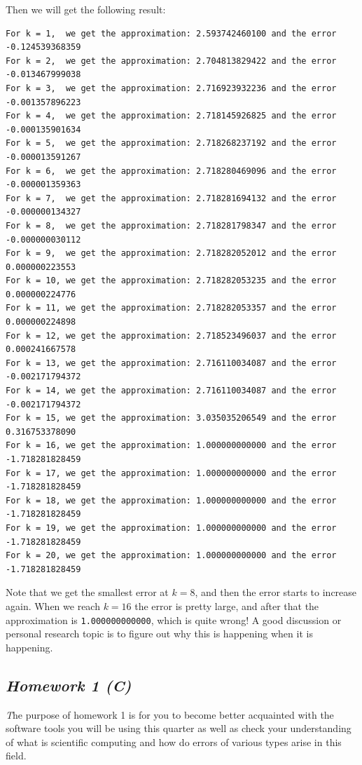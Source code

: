 \documentclass[11pt,a4paper,oneside]{report}
\begin{document}
Then we will get the following result:
\begin{verbatim}
For k = 1,  we get the approximation: 2.593742460100 and the error -0.124539368359 
For k = 2,  we get the approximation: 2.704813829422 and the error -0.013467999038 
For k = 3,  we get the approximation: 2.716923932236 and the error -0.001357896223 
For k = 4,  we get the approximation: 2.718145926825 and the error -0.000135901634 
For k = 5,  we get the approximation: 2.718268237192 and the error -0.000013591267 
For k = 6,  we get the approximation: 2.718280469096 and the error -0.000001359363 
For k = 7,  we get the approximation: 2.718281694132 and the error -0.000000134327 
For k = 8,  we get the approximation: 2.718281798347 and the error -0.000000030112 
For k = 9,  we get the approximation: 2.718282052012 and the error  0.000000223553 
For k = 10, we get the approximation: 2.718282053235 and the error  0.000000224776 
For k = 11, we get the approximation: 2.718282053357 and the error  0.000000224898 
For k = 12, we get the approximation: 2.718523496037 and the error  0.000241667578 
For k = 13, we get the approximation: 2.716110034087 and the error -0.002171794372 
For k = 14, we get the approximation: 2.716110034087 and the error -0.002171794372 
For k = 15, we get the approximation: 3.035035206549 and the error  0.316753378090 
For k = 16, we get the approximation: 1.000000000000 and the error -1.718281828459 
For k = 17, we get the approximation: 1.000000000000 and the error -1.718281828459 
For k = 18, we get the approximation: 1.000000000000 and the error -1.718281828459 
For k = 19, we get the approximation: 1.000000000000 and the error -1.718281828459 
For k = 20, we get the approximation: 1.000000000000 and the error -1.718281828459 
\end{verbatim}

Note that we get the smallest error at $k = 8$, and then the error starts to increase again. When we reach $k=16$ the error is pretty large, and after that the approximation is \verb+1.000000000000+, which is quite wrong! A good discussion or personal research topic is to figure out why this is happening when it is happening.
\newpage
{\center\color{magenta}
\subsection*{{\it\huge Homework 1 (C)}}}

{\it\huge T}he purpose of homework 1 is for you to become better acquainted with the software tools you will be using this quarter as well as check your understanding of what is scientific computing and how do errors of various types arise in this field. \\
\end{document}
